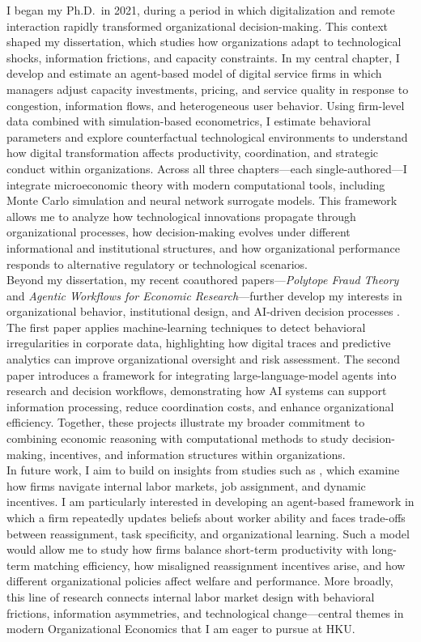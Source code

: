 \documentclass{nfr}
\begin{document}
I began my Ph.D.\ in 2021, during a period in which digitalization and remote interaction rapidly transformed organizational decision-making. 
This context shaped my dissertation, which studies how organizations adapt to technological shocks, information frictions, and capacity constraints. 
In my central chapter, I develop and estimate an agent-based model of digital service firms in which managers adjust capacity investments, pricing, and service quality in response to congestion, information flows, and heterogeneous user behavior. 
Using firm-level data combined with simulation-based econometrics, I estimate behavioral parameters and explore counterfactual technological environments to understand how digital transformation affects productivity, coordination, and strategic conduct within organizations.
Across all three chapters—each single-authored—I integrate microeconomic theory with modern computational tools, including Monte Carlo simulation and neural network surrogate models. 
This framework allows me to analyze how technological innovations propagate through organizational processes, how decision-making evolves under different informational and institutional structures, and how organizational performance responds to alternative regulatory or technological scenarios.\\

Beyond my dissertation, my recent coauthored papers—\textit{Polytope Fraud Theory} and \textit{Agentic Workflows for Economic Research}—further develop my interests in organizational behavior, institutional design, and AI-driven decision processes \citep{Zhao2025, Dawid2025}. 
The first paper applies machine-learning techniques to detect behavioral irregularities in corporate data, highlighting how digital traces and predictive analytics can improve organizational oversight and risk assessment. 
The second paper introduces a framework for integrating large-language-model agents into research and decision workflows, demonstrating how AI systems can support information processing, reduce coordination costs, and enhance organizational efficiency. 
Together, these projects illustrate my broader commitment to combining economic reasoning with computational methods to study decision-making, incentives, and information structures within organizations.\\

In future work, I aim to build on insights from studies such as \citet{fahn2025dynamics}, which examine how firms navigate internal labor markets, job assignment, and dynamic incentives. 
I am particularly interested in developing an agent-based framework in which a firm repeatedly updates beliefs about worker ability and faces trade-offs between reassignment, task specificity, and organizational learning. 
Such a model would allow me to study how firms balance short-term productivity with long-term matching efficiency, how misaligned reassignment incentives arise, and how different organizational policies affect welfare and performance. 
More broadly, this line of research connects internal labor market design with behavioral frictions, information asymmetries, and technological change—central themes in modern Organizational Economics that I am eager to pursue at HKU.\\
\end{document}
